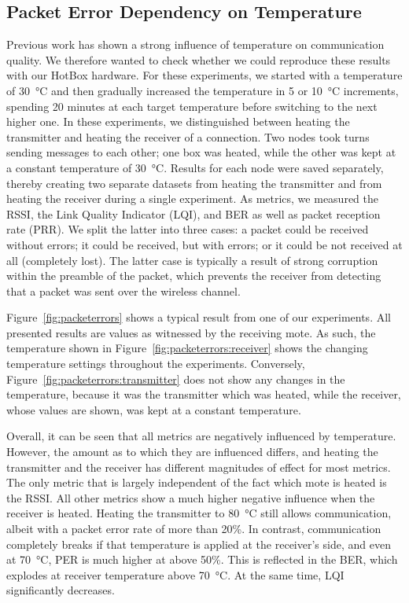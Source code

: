 \documentclass[color]{aib}
\begin{document}
\subsection{Packet Error Dependency on Temperature}
\label{sec:packeterrors}
Previous work\cite{bannister08hot,boano10transaction,boano13extreme,wennerstrom13extreme,boano14templab} has shown a strong influence of temperature on communication quality.
We therefore wanted to check whether we could reproduce these results with our HotBox hardware.
For these experiments, we started with a temperature of \SI{30}{\celsius} and then gradually increased the temperature in 5 or \SI{10}{\celsius} increments, spending 20 minutes at each target temperature before switching to the next higher one.
In these experiments, we distinguished between heating the transmitter and heating the receiver of a connection.
Two nodes took turns sending messages to each other; one box was heated, while the other was kept at a constant temperature of \SI{30}{\celsius}.
Results for each node were saved separately, thereby creating two separate datasets from heating the transmitter and from heating the receiver during a single experiment.
As metrics, we measured the RSSI, the Link Quality Indicator (LQI), and BER as well as packet reception rate (PRR).
We split the latter into three cases: a packet could be received without errors; it could be received, but with errors; or it could be not received at all (completely lost).
The latter case is typically a result of strong corruption within the preamble of the packet, which prevents the receiver from detecting that a packet was sent over the wireless channel.

Figure~\ref{fig:packeterrors} shows a typical result from one of our experiments.
All presented results are values as witnessed by the receiving mote.
As such, the temperature shown in Figure~\ref{fig:packeterrors:receiver} shows the changing temperature settings throughout the experiments.
Conversely, Figure~\ref{fig:packeterrors:transmitter} does not show any changes in the temperature, because it was the transmitter which was heated, while the receiver, whose values are shown, was kept at a constant temperature.

Overall, it can be seen that all metrics are negatively influenced by temperature.
However, the amount as to which they are influenced differs, and heating the transmitter and the receiver has different magnitudes of effect for most metrics.
The only metric that is largely independent of the fact which mote is heated is the RSSI.
All other metrics show a much higher negative influence when the receiver is heated.
Heating the transmitter to \SI{80}{\celsius} still allows communication, albeit with a packet error rate of more than 20\%.
In contrast, communication completely breaks if that temperature is applied at the receiver's side, and even at \SI{70}{\celsius}, PER is much higher at above 50\%.
This is reflected in the BER, which explodes at receiver temperature above \SI{70}{\celsius}.
At the same time, LQI significantly decreases.
\end{document}
